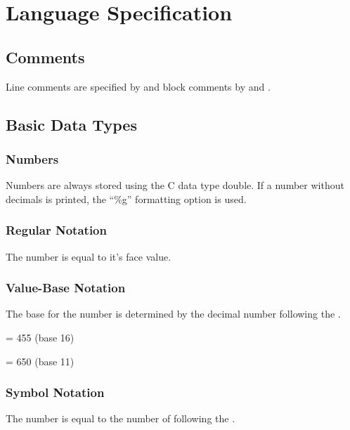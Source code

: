 
\chapter{Language Specification}

\section{Comments}
Line comments are specified by \greybox{\textasciitilde|} and block comments by \greybox{\textasciitilde\{} and \greybox{\}\textasciitilde}.




\section{Basic Data Types}
\subsection{Numbers}
Numbers are always stored using the C data type double. If a number without decimals is printed, the \enquote{\%g} formatting option is used.

\subsection{Regular Notation}
The number is equal to it's face value.

  

\subsection{Value-Base Notation}
The base for the number is determined by the decimal number following the .

 = 455 (base 16)

 = 650 (base 11)

\subsection{Symbol Notation}
The number is equal to the number of \greybox{\#} following the .

